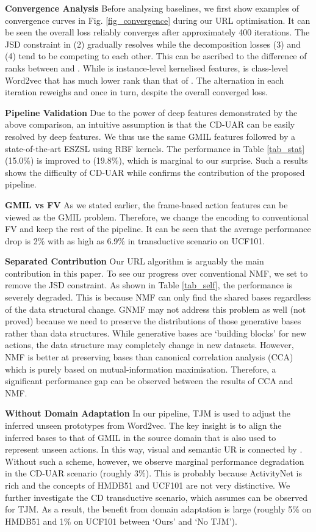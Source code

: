 \documentclass[10pt,twocolumn,letterpaper]{article}
\begin{document}
\noindent\textbf{Convergence Analysis} Before analysing baselines, we first show examples of convergence curves in Fig. \ref{fig_convergence} during our URL optimisation. It can be seen the overall loss reliably converges after approximately 400 iterations. The JSD constraint in (2) gradually resolves while the decomposition losses (3) and (4) tend to be competing to each other. This can be ascribed to the difference of ranks between  and . While  is instance-level kernelised features,  is class-level Word2vec that has much lower rank than that of . The alternation in each iteration reweighs  and  once in turn, despite the overall converged loss.

\noindent\textbf{Pipeline Validation} Due to the power of deep features demonstrated by the above comparison, an intuitive assumption is that the CD-UAR can be easily resolved by deep features. We thus use the same GMIL features followed by a state-of-the-art ESZSL \cite{2015_embarrassingly} using RBF kernels. The performance in Table \ref{tab_stat} (15.0\%) is improved to (19.8\%), which is marginal to our surprise. Such a results shows the difficulty of CD-UAR while confirms the contribution of the proposed pipeline.

\noindent\textbf{GMIL vs FV} As we stated earlier, the frame-based action features can be viewed as the GMIL problem. Therefore, we change the encoding to conventional FV and keep the rest of the pipeline. It can be seen that the average performance drop is 2\% with as high as 6.9\% in transductive scenario on UCF101.

\noindent\textbf{Separated Contribution} Our URL algorithm is arguably the main contribution in this paper. To see our progress over conventional NMF, we set  to remove the JSD constraint. As shown in Table \ref{tab_self}, the performance is severely degraded. This is because NMF can only find the shared bases regardless of the data structural change. GNMF \cite{cai2011graph} may not address this problem as well (not proved) because we need to preserve the distributions of those generative bases rather than data structures. While generative bases are `building blocks' for new actions, the data structure may completely change in new datasets. However, NMF is better at preserving bases than canonical correlation analysis (CCA) which is purely based on mutual-information maximisation. Therefore, a significant performance gap can be observed between the results of CCA and NMF.

\noindent\textbf{Without Domain Adaptation} In our pipeline, TJM is used to adjust the inferred unseen prototypes from Word2vec. The key insight is to align the inferred bases to that of GMIL in the source domain that is also used to represent unseen actions. In this way, visual and semantic UR is connected by . Without such a scheme, however, we observe marginal performance degradation in the  CD-UAR scenario (roughly 3\%). This is probably because ActivityNet is rich and the concepts of HMDB51 and UCF101 are not very distinctive. We further investigate the CD transductive scenario, which assumes  can be observed for TJM. As a result, the benefit from domain adaptation is large (roughly 5\% on HMDB51 and 1\% on UCF101 between `Ours' and `No TJM').
\end{document}
